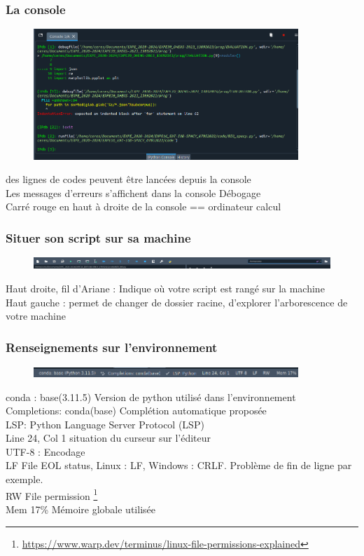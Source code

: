 \begin{frame}  \frametitle{La console}
  \begin{figure}
  \includegraphics[width=10cm]{images/spyder_console.png}
  \end{figure}
   des lignes de codes peuvent être lancées depuis la console\\
   Les messages d'erreurs s'affichent dans la console  Débogage\\
   Carré rouge en haut à droite de la console  == ordinateur calcul
\end{frame}

\begin{frame}
  \frametitle{Situer son script sur sa machine}
  \begin{figure}
  \includegraphics[width=15cm]{images/spyder_chemin.png}
  \end{figure}
   Haut droite, fil d'Ariane : Indique où votre script est rangé sur la machine\\
   Haut gauche : permet de changer de dossier racine, d'explorer l'arborescence de votre machine
\end{frame}

\begin{frame}
  \frametitle{Renseignements sur l'environnement}
  \begin{figure}
  \includegraphics[width=10cm]{images/spyder_infos.png}
  \end{figure}
   conda : base(3.11.5)  Version de python utilisé dans l'environnement\\
   Completions: conda(base)  Complétion automatique proposée\\
   LSP: Python  Language Server Protocol (LSP) \\
   Line 24, Col 1  situation du curseur sur l'éditeur\\
  UTF-8 : Encodage\\
   LF  File EOL status, Linux : LF, Windows : CRLF. Problème de fin de ligne par exemple.\\
   RW  File permission \footnote{\url{https://www.warp.dev/terminus/linux-file-permissions-explained}}\\
  Mem 17\%  Mémoire globale utilisée
  
\end{frame}

